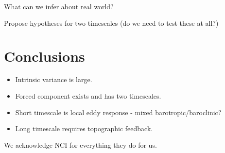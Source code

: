 \documentclass{agujournal2019-navid}
\begin{document}
What can we infer about real world?

Propose hypotheses for two timescales (do we need to test these at all?)



\section{Conclusions}
\begin{itemize}
    \item Intrinsic variance is large.
    \item  Forced component exists and has two timescales.
    \item Short timescale is local eddy response - mixed  barotropic/baroclinic?
    \item Long timescale requires topographic feedback.

\end{itemize}



\acknowledgments
We acknowledge NCI for everything they do for us.


\end{document}
